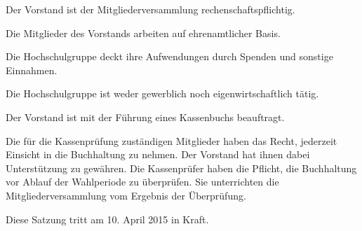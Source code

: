 \documentclass[a4paper, parskip=half, numbers=noenddot]{scrartcl}
\begin{document}
\begin{contract}
Der Vorstand ist der Mitgliederversammlung rechenschaftspflichtig.

Die Mitglieder des Vorstands arbeiten auf ehrenamtlicher Basis.


%
%


Die Hochschulgruppe deckt ihre Aufwendungen durch Spenden und sonstige
Einnahmen.

Die Hochschulgruppe ist weder gewerblich noch eigenwirtschaftlich tätig.

Der Vorstand ist mit der Führung eines Kassenbuchs beauftragt.

Die für die Kassenprüfung zuständigen Mitglieder haben das Recht, jederzeit
Einsicht in die Buchhaltung zu nehmen.
Der Vorstand hat ihnen dabei Unterstützung zu gewähren.
Die Kassenprüfer haben die Pflicht, die Buchhaltung vor Ablauf der Wahlperiode
zu überprüfen.
Sie unterrichten die Mitgliederversammlung vom Ergebnis der Überprüfung.


%
%


Diese Satzung tritt am 10. April 2015 in Kraft.

\end{contract}
\end{document}
